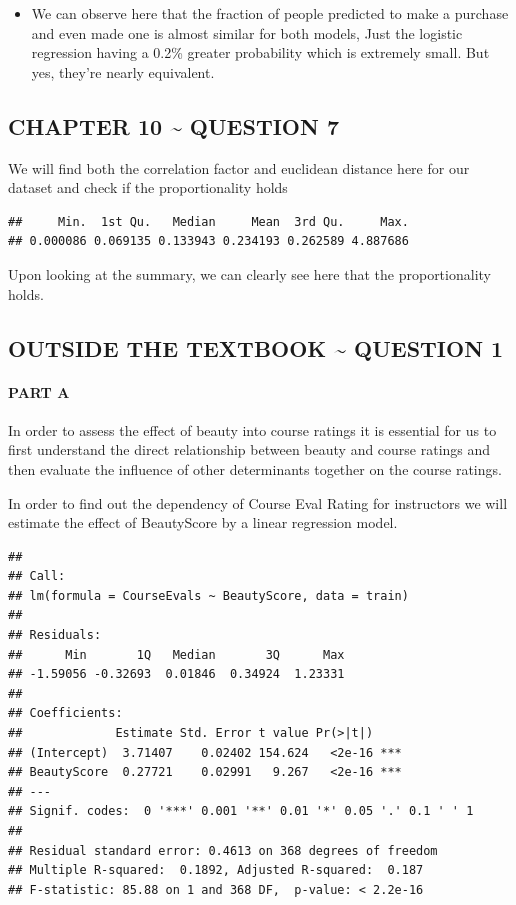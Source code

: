 \documentclass[
]{article}
\providecommand{\tightlist}{%
  \setlength{\itemsep}{0pt}\setlength{\parskip}{0pt}}
\begin{document}
\begin{itemize}
\tightlist
\item
  We can observe here that the fraction of people predicted to make a
  purchase and even made one is almost similar for both models, Just the
  logistic regression having a 0.2\% greater probability which is
  extremely small. But yes, they're nearly equivalent.
\end{itemize}

\hypertarget{chapter-10-question-7}{%
\subsection{CHAPTER 10 \textasciitilde{} QUESTION
7}\label{chapter-10-question-7}}

We will find both the correlation factor and euclidean distance here for
our dataset and check if the proportionality holds

\begin{verbatim}
##     Min.  1st Qu.   Median     Mean  3rd Qu.     Max. 
## 0.000086 0.069135 0.133943 0.234193 0.262589 4.887686
\end{verbatim}

Upon looking at the summary, we can clearly see here that the
proportionality holds.

\hypertarget{outside-the-textbook-question-1}{%
\subsection{OUTSIDE THE TEXTBOOK \textasciitilde{} QUESTION
1}\label{outside-the-textbook-question-1}}

\hypertarget{part-a-6}{%
\paragraph{\texorpdfstring{{PART A}}{PART A}}\label{part-a-6}}

In order to assess the effect of beauty into course ratings it is
essential for us to first understand the direct relationship between
beauty and course ratings and then evaluate the influence of other
determinants together on the course ratings.

In order to find out the dependency of Course Eval Rating for
instructors we will estimate the effect of BeautyScore by a linear
regression model.

\begin{verbatim}
## 
## Call:
## lm(formula = CourseEvals ~ BeautyScore, data = train)
## 
## Residuals:
##      Min       1Q   Median       3Q      Max 
## -1.59056 -0.32693  0.01846  0.34924  1.23331 
## 
## Coefficients:
##             Estimate Std. Error t value Pr(>|t|)    
## (Intercept)  3.71407    0.02402 154.624   <2e-16 ***
## BeautyScore  0.27721    0.02991   9.267   <2e-16 ***
## ---
## Signif. codes:  0 '***' 0.001 '**' 0.01 '*' 0.05 '.' 0.1 ' ' 1
## 
## Residual standard error: 0.4613 on 368 degrees of freedom
## Multiple R-squared:  0.1892, Adjusted R-squared:  0.187 
## F-statistic: 85.88 on 1 and 368 DF,  p-value: < 2.2e-16
\end{verbatim}
\end{document}

